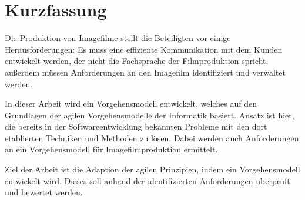 \chapter*{Kurzfassung}
Die Produktion von Imagefilme stellt die Beteiligten vor einige Herausforderungen: Es muss eine effiziente Kommunikation mit dem Kunden entwickelt werden, der nicht die Fachsprache der Filmproduktion spricht, außerdem müssen Anforderungen an den Imagefilm identifiziert und verwaltet werden.

In dieser Arbeit wird ein Vorgehensmodell entwickelt, welches auf den Grundlagen der agilen Vorgehensmodelle der Informatik basiert. Ansatz ist hier, die bereits in der Softwareentwicklung bekannten Probleme mit den dort etablierten Techniken und Methoden zu lösen. Dabei werden auch Anforderungen an ein Vorgehensmodell für Imagefilmproduktion ermittelt.

Ziel der Arbeit ist die Adaption der agilen Prinzipien, indem ein Vorgehensmodell entwickelt wird. Dieses soll anhand der identifizierten Anforderungen überprüft und bewertet werden.


